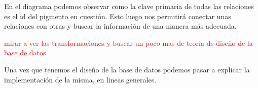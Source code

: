 En el diagrama podemos observar como la clave primaria de todas las relaciones es el id del pigmento en cuestión. Esto luego nos permitirá conectar unas relaciones con otras y buscar la información de una manera más adecuada. 

\textcolor{red}{mirar a ver las transformaciones y buscar un poco mas de teoría de diseño de la base de datos}

Una vez que tenemos el diseño de la base de datos podemos pasar a explicar la implementación de la misma, en lineas generales. 
